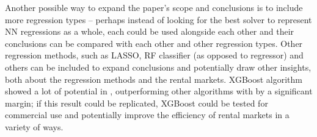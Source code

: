 \documentclass[12pt]{report}
\begin{document}
Another possible way to expand the paper's scope and conclusions is to include more regression types -- perhaps instead of looking for the best solver to represent NN regressions as a whole, each could be used alongside each other and their conclusions can be compared with each other and other regression types. Other regression methods, such as LASSO, RF classifier (as opposed to regressor) and others can be included to expand conclusions and potentially draw other insights, both about the regression methods and the rental markets. XGBoost algorithm showed a lot of potential in \cite{yoshida2022}, outperforming other algorithms with by a significant margin; if this result could be replicated, XGBoost could be tested for commercial use and potentially improve the efficiency of rental markets in a variety of ways.

\printbibliography

\appendix

\newpage
\end{document}
